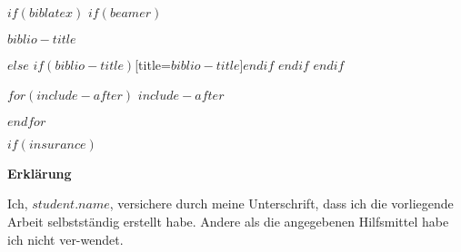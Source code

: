 \documentclass[
    12pt,
    a4paper,
    $if(lang)$
        $babel-lang$,
    $endif$
    bibliography=totocnumbered,
    listof=totocnumbered
]{scrartcl}
\begin{document}
$if(biblatex)$
    $if(beamer)$
\begin{frame}[allowframebreaks]{$biblio-title$}
  \bibliographytrue
  \printbibliography[heading=none]
\end{frame}
    $else$
\printbibliography$if(biblio-title)$[title=$biblio-title$]$endif$
    $endif$
$endif$

$for(include-after)$
$include-after$

$endfor$




%	


$if(insurance)$
\newpage
\thispagestyle{empty}
\begin{center}
	\vspace*{5em}
	\huge\textbf{Erklärung}\\
\end{center}
\vspace{2em}
Ich, $student.name$,  versichere  durch  meine  Unterschrift,  dass  ich  die  vorliegende Arbeit selbstständig erstellt habe. Andere als die angegebenen Hilfsmittel habe ich nicht ver-wendet. 
\end{document}
